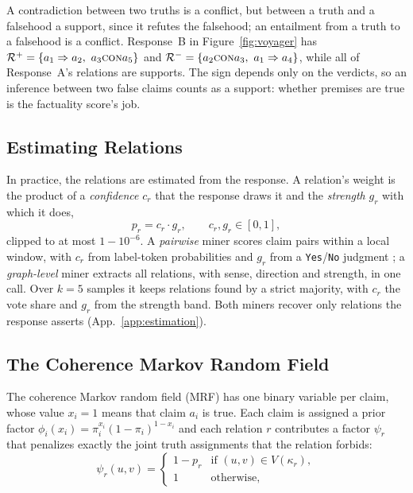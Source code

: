 A contradiction between two truths is a conflict, but between a truth and a falsehood a support,
since it refutes the falsehood; an entailment from a truth to a falsehood is a conflict. Response~B in
Figure~\ref{fig:voyager} has $\mathcal{R}^{+}=\{a_1\Rightarrow a_2,\
a_3\textsc{con} a_5\}$ and $\mathcal{R}^{-}=\{a_2\textsc{con} a_3,\ a_1\Rightarrow a_4\}$, while all of Response~A's relations are supports.
The sign depends only on the verdicts, so an inference between two false claims counts as a
support: whether premises are true is the factuality score's job.

\subsection{Estimating Relations}
\label{sec:mining}

In practice, the relations are estimated from the response. A relation's weight is the product of a
\emph{confidence} $c_r$ that the response draws it and the \emph{strength} $g_r$ with which it does,
\begin{equation}
p_r=c_r\cdot g_r,\qquad c_r,g_r\in[0,1],
\label{eq:decomp}
\end{equation}
clipped to at most $1-10^{-6}$. A \emph{pairwise} miner scores claim pairs within a local window, with $c_r$ from label-token
probabilities and $g_r$ from a \texttt{Yes}/\texttt{No} judgment \citep{kadavath}; a \emph{graph-level}
miner extracts all relations, with sense, direction and strength, in one call. 
Over $k=5$ samples it keeps relations found by a strict majority, with $c_r$ the vote share and $g_r$
from the strength band. Both miners recover only relations the response asserts
(App.~\ref{app:estimation}).



\subsection{The Coherence Markov Random Field}
\label{sec:mrf}

The coherence Markov random field (MRF) has one binary variable per claim, whose value $x_i=1$
means that claim $a_i$ is true. Each claim is assigned a prior factor $\phi_i(x_i)=\pi_i^{x_i}(1-\pi_i)^{1-x_i}$
and each relation $r$ contributes a factor $\psi_r$ that penalizes exactly the joint truth assignments that the relation forbids:
\begin{equation}
\psi_r(u,v)=
\begin{cases}
1-p_r & \text{if } (u,v)\in V(\kappa_r),\\
1 & \text{otherwise},
\end{cases}
\label{eq:psi}
\end{equation}

